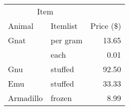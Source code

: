 \documentclass{book}
\begin{document}
\centering

\begin{tabular}{@{}llr@{}} \toprule
\multicolumn{2}{c}{Item}\\ \cmidrule(r){1-2}
Animal    & Itemlist & Price (\$)\\\midrule
Gnat      & per gram & 13.65 \\
          & each     & 0.01 \\
Gnu       & stuffed  & 92.50 \\
Emu       & stuffed  & 33.33 \\
Armadillo & frozen   & 8.99 \\ \bottomrule
\end{tabular}
\end{document}
